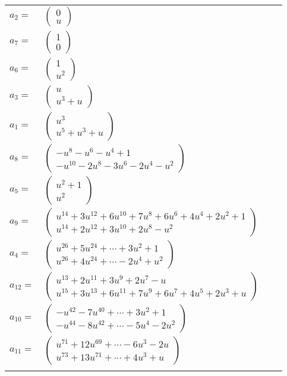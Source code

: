 \documentclass[1p]{elsarticle_modified}
\theoremstyle{definition}
\begin{document}
\begin{tabular}{m{7pt} m{180pt} m{7pt} m{180pt} }
\flushright $a_{2}=$&$\begin{pmatrix}0\\u\end{pmatrix}$ \\
\flushright $a_{7}=$&$\begin{pmatrix}1\\0\end{pmatrix}$ \\
\flushright $a_{6}=$&$\begin{pmatrix}1\\u^2\end{pmatrix}$ \\
\flushright $a_{3}=$&$\begin{pmatrix}u\\u^3+u\end{pmatrix}$ \\
\flushright $a_{1}=$&$\begin{pmatrix}u^3\\u^5+u^3+u\end{pmatrix}$ \\
\flushright $a_{8}=$&$\begin{pmatrix}- u^8- u^6- u^4+1\\- u^{10}-2 u^8-3 u^6-2 u^4- u^2\end{pmatrix}$ \\
\flushright $a_{5}=$&$\begin{pmatrix}u^2+1\\u^2\end{pmatrix}$ \\
\flushright $a_{9}=$&$\begin{pmatrix}u^{14}+3 u^{12}+6 u^{10}+7 u^8+6 u^6+4 u^4+2 u^2+1\\u^{14}+2 u^{12}+3 u^{10}+2 u^8- u^2\end{pmatrix}$ \\
\flushright $a_{4}=$&$\begin{pmatrix}u^{26}+5 u^{24}+\cdots+3 u^2+1\\u^{26}+4 u^{24}+\cdots-2 u^4+u^2\end{pmatrix}$ \\
\flushright $a_{12}=$&$\begin{pmatrix}u^{13}+2 u^{11}+3 u^9+2 u^7- u\\u^{15}+3 u^{13}+6 u^{11}+7 u^9+6 u^7+4 u^5+2 u^3+u\end{pmatrix}$ \\
\flushright $a_{10}=$&$\begin{pmatrix}- u^{42}-7 u^{40}+\cdots+3 u^2+1\\- u^{44}-8 u^{42}+\cdots-5 u^4-2 u^2\end{pmatrix}$ \\
\flushright $a_{11}=$&$\begin{pmatrix}u^{71}+12 u^{69}+\cdots-6 u^3-2 u\\u^{73}+13 u^{71}+\cdots+4 u^3+u\end{pmatrix}$\\&\end{tabular}
\end{document}
